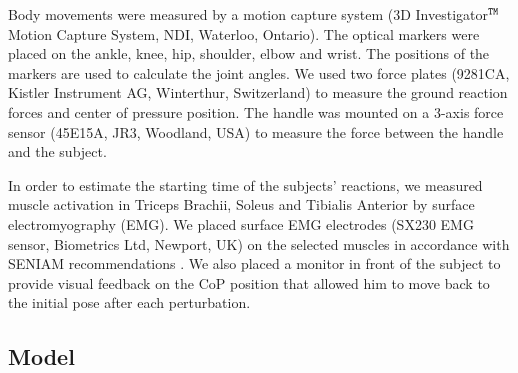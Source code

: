 Body movements were measured by a motion capture system (3D
Investigator$^{\tt\small TM}$ Motion Capture System, NDI, Waterloo, Ontario).
The optical markers were placed on the ankle, knee, hip, shoulder, elbow and
wrist.  The positions of the markers are used to calculate the joint angles.
We used two force plates (9281CA, Kistler Instrument AG, Winterthur,
Switzerland) to measure the ground reaction forces and center of pressure
position.  The handle was mounted on a 3-axis force sensor (45E15A, JR3,
Woodland, USA) to measure the force between the handle and the subject.

In order to estimate the starting time of the subjects' reactions, we measured
muscle activation in Triceps Brachii, Soleus and Tibialis Anterior by surface
electromyography (EMG).  We placed surface EMG electrodes (SX230 EMG sensor,
Biometrics Ltd, Newport, UK) on the selected muscles in accordance with SENIAM
recommendations \cite{Hermensetal99}.  We also placed a monitor in front of
the subject to provide visual feedback on the CoP position that allowed him to
move back to the initial pose after each perturbation.


\subsection{Model}

